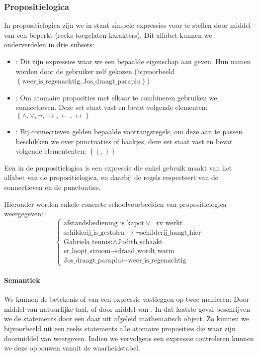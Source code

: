 \subsubsection{Propositielogica}
In propositielogica zijn we in staat simpele expressies voor te stellen door middel van een beperkt  (reeks toegelaten karakters). Dit alfabet kunnen we onderverdelen in drie subsets:
\begin{itemize}
 \item {}: Dit zijn expressies waar we een bepaalde eigenschap aan geven. Hun namen worden door de gebruiker zelf gekozen (bijvoorbeeld $\left\{\mbox{weer\_is\_regenachtig},\mbox{Jos\_draagt\_paraplu}\right\}$)
 \item {}: Om atomaire proposities met elkaar te combineren gebruiken we connectieven. Deze set staat vast en bevat volgende elementen: $\left\{\wedge,\vee,\neg,\rightarrow,\leftarrow,\leftrightarrow\right\}$
 \item {}: Bij connectieven gelden bepaalde voorrangsregels, om deze aan te passen beschikken we over punctuaties of haakjes, deze set staat vast en bevat volgende elemententen: $\left\{(,)\right\}$
\end{itemize}
Een  in de propositielogica is een expressie die enkel gebruik maakt van het alfabet van de propositielogica, en daarbij de regels respecteert van de connectieven en de punctuaties.
\begin{leftbar}
Hieronder worden enkele concrete schoolvoorbeelden van propositielogica weergegeven:
\begin{equation}
\left\{\begin{array}{l}
\mbox{afstandsbediening\_is\_kapot}\vee\neg\mbox{tv\_werkt}\\
\mbox{schilderij\_is\_gestolen}\rightarrow\neg\mbox{schilderij\_hangt\_hier}\\
\mbox{Gabriela\_tennist}\wedge\mbox{Judith\_schaakt}\\
\mbox{er\_loopt\_stroom}\rightarrow\mbox{draad\_wordt\_warm}\\
\mbox{Jos\_draagt\_paraplu}\leftarrow\mbox{weer\_is\_regenachtig}
\end{array}\right.
\end{equation}
\end{leftbar}
\paragraph{Semantiek}
We kunnen de betekenis of  van een expressie vastleggen op twee manieren: Door middel van natuurlijke taal, of door middel van . In dat laatste geval beschrijven we de statements door een daar uit afgeleid mathematisch object. Zo kunnen we bijvoorbeeld uit een reeks statements alle atomaire proposities die waar zijn doormiddel van  weergeven. Indien we vervolgens een expressie controleren kunnen we deze opbouwen vanuit de waarheidstabel.
